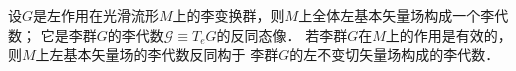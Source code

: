\begin{theorem}\label{chlg:thm_liegaeb}
    设$G$是左作用在光滑流形$M$上的李变换群，则$M$上全体左基本矢量场构成一个李代数；
    它是李群$G$的李代数$\mathscr{G}\equiv T_e G$的{\kaishu 反}同态像．
    若李群$G$在$M$上的作用是有效的，则$M$上左基本矢量场的李代数{\kaishu 反}同构于
    李群$G$的左不变切矢量场构成的李代数．
\end{theorem}


